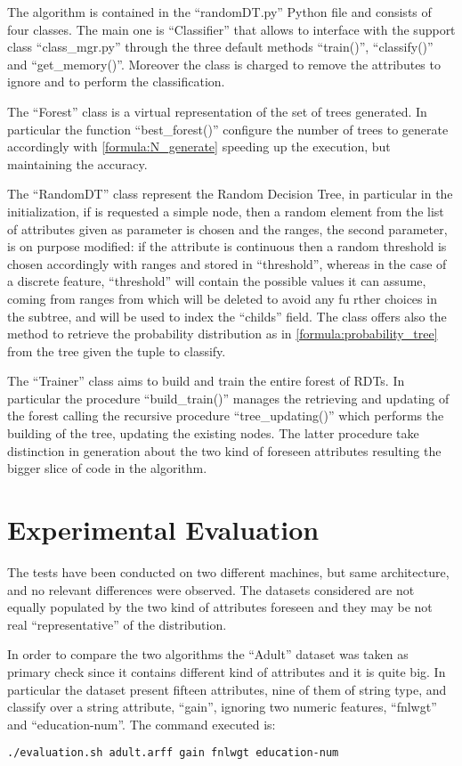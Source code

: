 \documentclass{acm_proc_article-sp-sigmod07}
\begin{document}
The algorithm is contained in the ``randomDT.py'' Python file and consists
of four classes. The main one is ``Classifier'' that allows to interface
with the support class ``class\_mgr.py'' through the three default methods
``train()'', ``classify()'' and ``get\_memory()''. Moreover the class is
charged to remove the attributes to ignore and to perform the
classification.

The ``Forest'' class is a virtual representation of the set of trees
generated. In particular the function ``best\_forest()'' configure the
number of trees to generate accordingly with \ref{formula:N_generate}
speeding up the execution, but maintaining the accuracy.

The ``RandomDT'' class represent the Random Decision Tree, in particular
in the initialization, if is requested a simple node, then a random
element from the list of attributes given as parameter is chosen and the
ranges, the second parameter, is on purpose modified: if the attribute is
continuous then a random threshold is chosen accordingly with
ranges and stored in ``threshold'', whereas in the case of a discrete
feature, ``threshold'' will contain the possible values it can
assume, coming from ranges from which will be deleted to avoid any fu
rther choices in the subtree, and will be used to index the ``childs''
field. The class offers also the method to retrieve the probability
distribution as in \ref{formula:probability_tree} from the tree given the
tuple to classify.

The ``Trainer'' class aims to build and train the entire forest of RDTs.
In particular the procedure ``build\_train()'' manages the retrieving and
updating of the forest calling the recursive procedure
``tree\_updating()'' which performs the building of the tree, updating the
existing nodes. The latter procedure take distinction in generation about
the two kind of foreseen attributes resulting the bigger slice of code in
the algorithm.

\section{Experimental Evaluation}
The tests have been conducted on two different machines, but same
architecture, and no relevant differences were observed. The datasets
considered are not equally populated by the two kind of attributes
foreseen and they may be not real ``representative'' of the distribution.

In order to compare the two algorithms the ``Adult'' dataset was taken as
primary check since it contains different kind of attributes and it is
quite big. In particular the dataset present fifteen attributes, nine of
them of string type, and classify over a string attribute, ``gain'',
ignoring two numeric features, ``fnlwgt'' and ``education-num''. The
command executed is:
\begin{verbatim}
./evaluation.sh adult.arff gain fnlwgt education-num
\end{verbatim}
\end{document}
